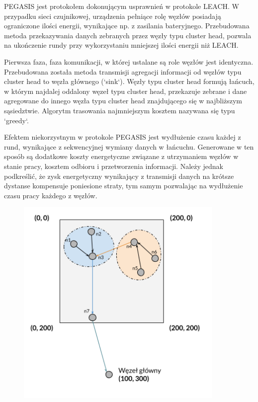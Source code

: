 \documentclass[a4paper,12pt,twoside,openany]{report}
\begin{document}
PEGASIS jest protokołem dokonującym usprawnień w protokole LEACH. W przypadku sieci czujnikowej, urządzenia pełniące rolę węzłów posiadają ograniczone ilości energii, wynikające np. z zasilania bateryjnego.
Przebudowana metoda przekazywania danych zebranych przez węzły typu cluster head, pozwala na ukończenie rundy przy wykorzystaniu mniejszej ilości energii niż LEACH.

Pierwsza faza, faza komunikacji, w której ustalane są role węzłów jest identyczna. Przebudowana została metoda transmisji agregacji informacji od węzłów typu cluster head to węzła głównego (`sink`).
Węzły typu cluster head formują łańcuch, w którym najdalej oddalony węzeł typu cluster head, przekazuje zebrane i dane agregowane do innego węzła typu cluster head znajdującego się w najbliższym 
sąsiedztwie. Algorytm trasowania najmniejszym kosztem nazywana się typu `greedy`. 

Efektem niekorzystnym w protokole PEGASIS jest wydłużenie czasu każdej z rund, wynikające z sekwencyjnej wymiany danych w łańcuchu.
Generowane w ten sposób są dodatkowe koszty energetyczne związane z utrzymaniem węzłów w stanie pracy, kosztem odbioru i przetworzenia informacji.
Należy jednak podkreślić, że zysk energetyczny wynikający z transmisji danych na krótsze dystanse kompensuje poniesione straty, tym samym pozwalając na wydłużenie czasu pracy każdego z węzłów.

\begin{figure}[H]
 \centering
 \includegraphics[width=10cm]{images/komunikacja_pegasis.png} 
\end{figure}
\end{document}
